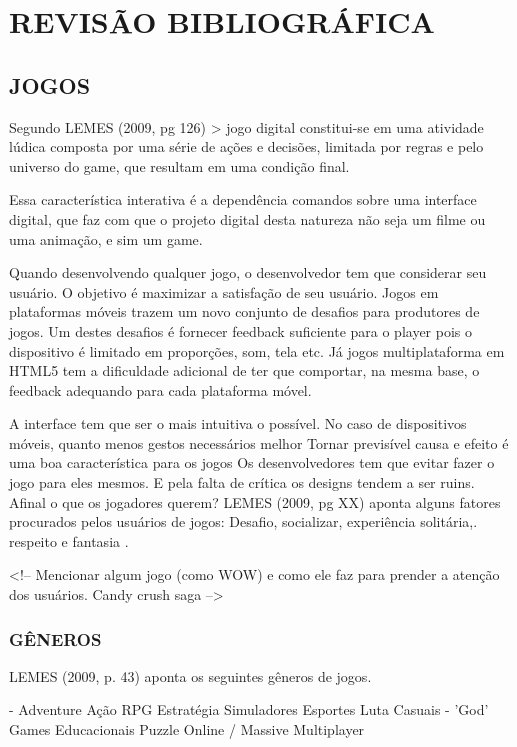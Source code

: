 \documentclass[11pt,a4paper]{article}
\begin{document}
\chapter{REVISÃO BIBLIOGRÁFICA}

\section{JOGOS}
Segundo LEMES (2009, pg 126) > jogo digital constitui-se em uma
atividade lúdica composta por uma série de ações e decisões,
limitada por regras e pelo universo do game, que resultam em uma
condição final.

Essa característica interativa é a dependência comandos
sobre uma interface digital, que faz com que o projeto digital desta
natureza não seja um filme ou uma animação, e sim um game.

Quando desenvolvendo qualquer jogo, o desenvolvedor tem que considerar
seu usuário. O objetivo é maximizar a satisfação de seu usuário.
Jogos em plataformas móveis trazem um novo conjunto de desafios para
produtores de jogos. Um destes desafios é fornecer feedback suficiente
para o player pois o dispositivo é limitado em proporções, som, tela
etc. Já jogos multiplataforma em HTML5 tem a dificuldade adicional
de ter que comportar, na mesma base, o feedback adequando para cada
plataforma móvel.

A interface tem que ser o mais intuitiva o possível. No caso de       
dispositivos móveis, quanto menos gestos necessários melhor Tornar   
previsível causa e efeito é uma boa característica para os jogos    
Os desenvolvedores tem que evitar fazer o jogo para eles mesmos. E     
pela falta de crítica os designs tendem a ser ruins. Afinal o que os  
jogadores querem? LEMES (2009, pg XX) aponta alguns fatores procurados
pelos usuários de jogos: Desafio, socializar, experiência solitária,.
respeito e fantasia                                                    .

<!-- Mencionar algum jogo (como WOW) e como ele faz para prender a
atenção dos usuários. Candy crush saga -->

\subsection{GÊNEROS}

LEMES (2009, p. 43) aponta os seguintes gêneros de jogos.

- Adventure Ação RPG Estratégia Simuladores Esportes Luta Casuais
- 'God' Games Educacionais Puzzle Online / Massive Multiplayer
\end{document}
